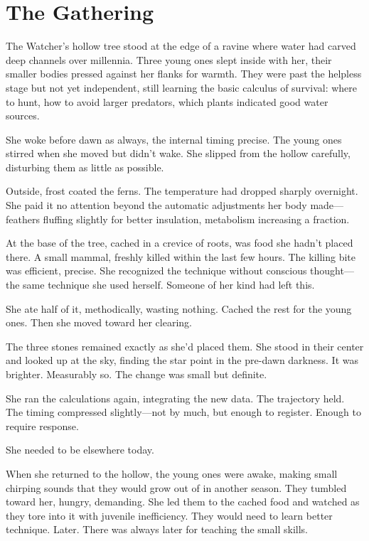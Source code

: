\chapter{The Gathering}
\label{ch:03}


The Watcher's hollow tree stood at the edge of a ravine where water had carved deep channels over millennia. Three young ones slept inside with her, their smaller bodies pressed against her flanks for warmth. They were past the helpless stage but not yet independent, still learning the basic calculus of survival: where to hunt, how to avoid larger predators, which plants indicated good water sources.

She woke before dawn as always, the internal timing precise. The young ones stirred when she moved but didn't wake. She slipped from the hollow carefully, disturbing them as little as possible.

Outside, frost coated the ferns. The temperature had dropped sharply overnight. She paid it no attention beyond the automatic adjustments her body made—feathers fluffing slightly for better insulation, metabolism increasing a fraction.

At the base of the tree, cached in a crevice of roots, was food she hadn't placed there. A small mammal, freshly killed within the last few hours. The killing bite was efficient, precise. She recognized the technique without conscious thought—the same technique she used herself. Someone of her kind had left this.

She ate half of it, methodically, wasting nothing. Cached the rest for the young ones. Then she moved toward her clearing.

The three stones remained exactly as she'd placed them. She stood in their center and looked up at the sky, finding the star point in the pre-dawn darkness. It was brighter. Measurably so. The change was small but definite.

She ran the calculations again, integrating the new data. The trajectory held. The timing compressed slightly—not by much, but enough to register. Enough to require response.

She needed to be elsewhere today.

When she returned to the hollow, the young ones were awake, making small chirping sounds that they would grow out of in another season. They tumbled toward her, hungry, demanding. She led them to the cached food and watched as they tore into it with juvenile inefficiency. They would need to learn better technique. Later. There was always later for teaching the small skills.

